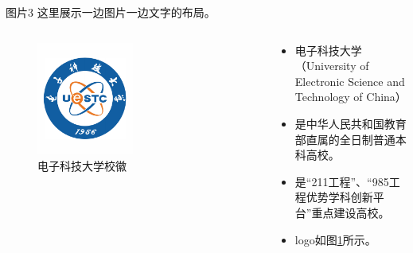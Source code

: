 \documentclass[aspectratio=169]{beamer}
\begin{document}
\begin{frame}{图片3}
    这里展示一边图片一边文字的布局。\\
    \begin{columns}[t]  %
        \begin{column}{0.5\textwidth}
            \begin{figure}
                \centering
                \includegraphics[width=0.5\textwidth]{logo.pdf}
                \caption{电子科技大学校徽}
                \label{fig:columnfig}
            \end{figure}
        \end{column}
        \begin{column}{0.5\textwidth}
            \begin{itemize}
                \item 电子科技大学（University of Electronic Science and Technology of China）
                \item 是中华人民共和国教育部直属的全日制普通本科高校。
                \item 是“211工程”、“985工程优势学科创新平台”重点建设高校。
                \item logo如图\ref{fig:columnfig}所示。
            \end{itemize}
        \end{column}
    \end{columns}
\end{frame}
\end{document}
